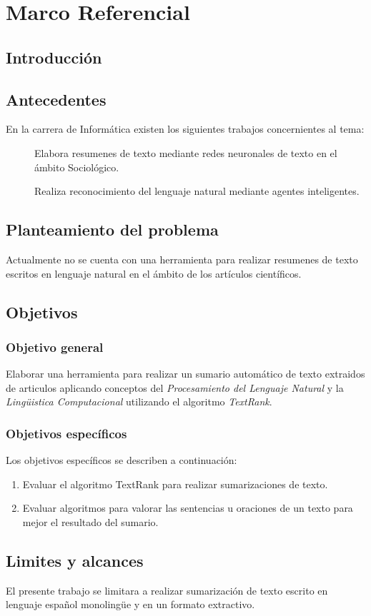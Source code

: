 \chapter{Marco Referencial}
\section{Introducci\'on}

\section{Antecedentes}
En la carrera de Inform\'atica existen los siguientes trabajos concernientes al tema:\\
\begin{description}
	\item[\cite{EZ01}] Elabora resumenes de texto mediante redes neuronales de texto en el
	\'ambito Sociol\'ogico.
	\item[\cite{HM05}] Realiza reconocimiento del lenguaje natural mediante agentes
	inteligentes.
\end{description}

\section{Planteamiento del problema}
Actualmente no se cuenta con una herramienta para realizar resumenes de texto escritos
en lenguaje natural en el \'ambito de los art\'iculos cient\'ificos.

\section{Objetivos}

\subsection{Objetivo general}
Elaborar una herramienta para realizar un sumario autom\'atico de texto extraidos de
articulos aplicando conceptos del \emph{Procesamiento del Lenguaje Natural} y
la \emph{Ling\"uistica Computacional} utilizando el algoritmo \emph{TextRank}.

\subsection{Objetivos espec\'ificos}
Los objetivos espec\'ificos se describen a continuaci\'on:
\begin{enumerate}
	\item Evaluar el algoritmo TextRank para realizar sumarizaciones de texto.
	\item Evaluar algoritmos para valorar las sentencias u oraciones de un texto para
	mejor el resultado del sumario.
\end{enumerate}

\section{Limites y alcances}
El presente trabajo se limitara a realizar sumarizaci\'on de texto escrito en lenguaje
espa\~nol monoling\"ue y en un formato extractivo.
